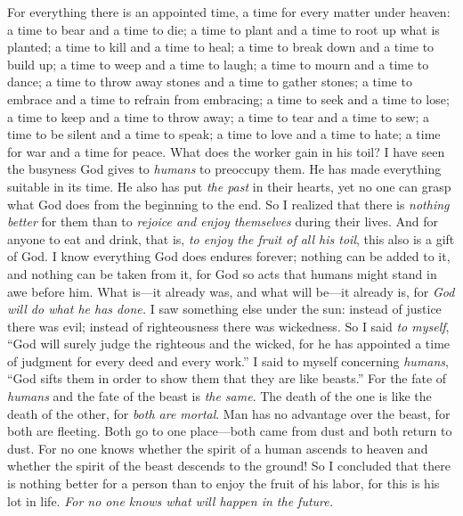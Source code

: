 \begin{biblechapter} %
 For everything there is an appointed time, a time for every matter under heaven:
\verse a time to bear and a time to die; 
a time to plant and a time to root up what is planted;
\verse a time to kill and a time to heal; 
a time to break down and a time to build up;
\verse a time to weep and a time to laugh; 
a time to mourn and a time to dance;
\verse a time to throw away stones and a time to gather stones; 
a time to embrace and a time to refrain from embracing;
\verse a time to seek and a time to lose; 
a time to keep and a time to throw away;
\verse a time to tear and a time to sew; 
a time to be silent and a time to speak;
\verse a time to love and a time to hate; 
a time for war and a time for peace.
\verse What does the worker gain in his toil?
 I have seen the busyness God gives to \textit{humans} to preoccupy them.
\verse He has made everything suitable in its time. He also has put \textit{the past} in their hearts, yet no one can grasp what God does from the beginning to the end.
\verse So I realized that there is \textit{nothing better} for them than to \textit{rejoice and enjoy themselves} during their lives.
\verse And for anyone to eat and drink, that is, \textit{to enjoy the fruit of all his toil}, this also is a gift of God.
\verse I know everything God does endures forever; 
nothing can be added to it, and nothing can be taken from it, 
for God so acts that humans might stand in awe before him.
\verse What is—it already was, 
and what will be—it already is, 
for \textit{God will do what he has done.}
 I saw something else under the sun: instead of justice there was evil; instead of righteousness there was wickedness.
\verse So I said \textit{to myself}, “God will surely judge the righteous and the wicked, for he has appointed a time of judgment for every deed and every work.”
\verse I said to myself concerning \textit{humans}, “God sifts them in order to show them that they are like beasts.”
\verse For the fate of \textit{humans} and the fate of the beast is \textit{the same}. The death of the one is like the death of the other, for \textit{both are mortal}. Man has no advantage over the beast, for both are fleeting.
\verse Both go to one place—both came from dust and both return to dust.
\verse For no one knows whether the spirit of a human ascends to heaven and whether the spirit of the beast descends to the ground!
\verse So I concluded that there is nothing better for a person than to enjoy the fruit of his labor, for this is his lot in life. \textit{For no one knows what will happen in the future.}
\end{biblechapter}

